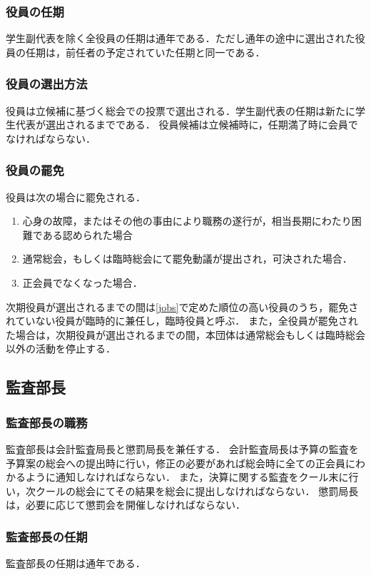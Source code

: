 \documentclass{ltjsarticle}
\begin{document}
      \subsubsection{役員の任期}
        \jor
        学生副代表を除く全役員の任期は通年である．ただし通年の途中に選出された役員の任期は，前任者の予定されていた任期と同一である．
      \subsubsection{役員の選出方法}
        \jor
        役員は立候補に基づく総会での投票で選出される．学生副代表の任期は新たに学生代表が選出されるまでである．
        役員候補は立候補時に，任期満了時に会員でなければならない．
      \subsubsection{役員の罷免}
        \jor
        役員は次の場合に罷免される．
        \begin{enumerate}
          \item 心身の故障，またはその他の事由により職務の遂行が，相当長期にわたり困難である認められた場合
          \item 通常総会，もしくは臨時総会にて罷免動議が提出され，可決された場合．
          \item 正会員でなくなった場合．
        \end{enumerate}
        次期役員が選出されるまでの間は\ref{jobs}で定めた順位の高い役員のうち，罷免されていない役員が臨時的に兼任し，臨時役員と呼ぶ．
        また，全役員が罷免された場合は，次期役員が選出されるまでの間，本団体は通常総会もしくは臨時総会以外の活動を停止する．
    \subsection{監査部長}\label{jjobs}
      \subsubsection{監査部長の職務}
        \jor
        監査部長は会計監査局長と懲罰局長を兼任する．
        会計監査局長は予算の監査を予算案の総会への提出時に行い，修正の必要があれば総会時に全ての正会員にわかるように通知しなければならない．
        また，決算に関する監査をクール末に行い，次クールの総会にてその結果を総会に提出しなければならない．
        懲罰局長は，必要に応じて懲罰会を開催しなければならない．
      \subsubsection{監査部長の任期}
        \jor
        監査部長の任期は通年である．
\end{document}
